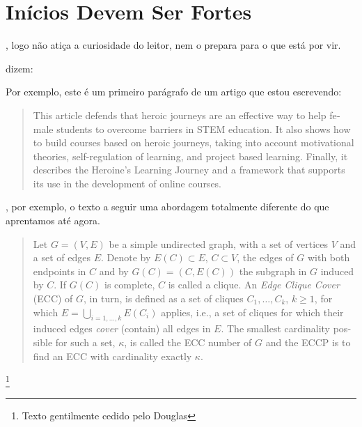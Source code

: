 \documentclass[openany]{book}
\begin{document}
\chapter{Inícios Devem Ser Fortes}

, logo não atiça a curiosidade do leitor, nem o prepara para o que está por vir.

\citeauthor{Knuth:1997} dizem:


 Por exemplo, este é um primeiro parágrafo de um artigo que estou escrevendo:

\foreignblockquote{english}{This article defends that heroic journeys are an effective way to help female students to overcome barriers in STEM education.
It also shows how to build courses based on heroic journeys, taking into account motivational theories, self-regulation of learning, and project based learning. Finally, it describes the Heroine's Learning  Journey and a framework that  supports its use in the development of online courses.}

, por exemplo, o texto a seguir uma abordagem totalmente diferente do que aprentamos até agora.

\foreignblockquote{english}{Let $G = (V,E)$ be a simple undirected graph, with a set of vertices $V$ and a set of edges $E$. Denote by $E(C) \subset E$, $C \subset V$, the edges of $G$ with both endpoints in $C$ and by $G(C) = (C,E(C))$ the subgraph in $G$ induced by $C$. If $G(C)$ is complete, $C$ is called a clique. An \textit{Edge Clique Cover} (ECC) of $G$, in turn, is defined as a set of cliques ${C_1,\ldots,C_k}$, $k \geq 1$, for which $E = \bigcup_{i=1,\ldots,k}E(C_i)$ applies, i.e., a set of cliques for which their induced edges \textit{cover} (contain) all edges in $E$. The smallest cardinality possible for such a set, $\kappa$, is called the ECC number of $G$ and the ECCP is to find an ECC with cardinality exactly $\kappa$.}\footnote{Texto gentilmente cedido pelo Douglas}
\end{document}
